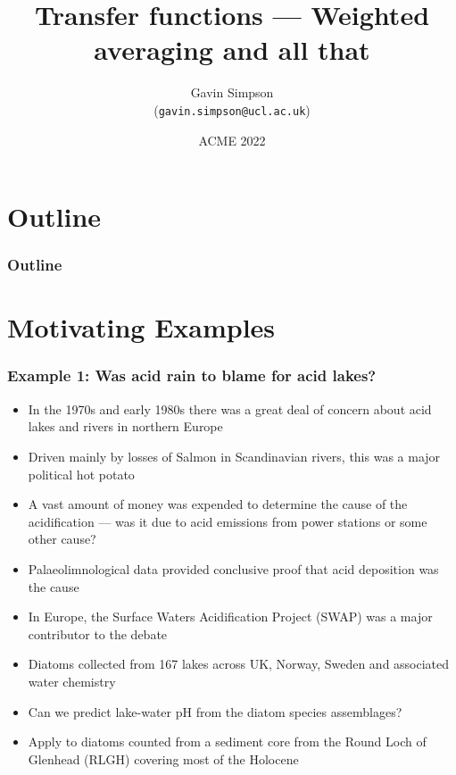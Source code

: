 \documentclass{beamer}
\title[Transfer functions]{Transfer functions --- Weighted averaging and all that}
\author[Gavin Simpson]{Gavin Simpson \\ (\texttt{gavin.simpson@ucl.ac.uk})}
\institute[Aarhus]{Aarhus University}
\date[ACME 2008]{ACME 2022}
\begin{document}
\begin{frame}
\titlepage
\end{frame}

\section*{Outline}
\begin{frame}
 \frametitle{Outline}
 \tableofcontents
\end{frame}

\section{Motivating Examples}
\begin{frame}
    \frametitle{Example 1: Was acid rain to blame for acid lakes?}
    \begin{itemize}
        \item In the 1970s and early 1980s there was a great deal of concern about acid lakes and rivers in northern Europe
        \item Driven mainly by losses of Salmon in Scandinavian rivers, this was a major political hot potato
        \item A vast amount of money was expended to determine the cause of the acidification --- was it due to acid emissions from power stations or some other cause?
        \item Palaeolimnological data provided conclusive proof that acid deposition was the cause
        \item In Europe, the Surface Waters Acidification Project (SWAP) was a major contributor to the debate
        \item Diatoms collected from 167 lakes across UK, Norway, Sweden and associated water chemistry
        \item Can we predict lake-water pH from the diatom species assemblages?
        \item Apply to diatoms counted from a sediment core from the Round Loch of Glenhead (RLGH) covering most of the Holocene
    \end{itemize}
\end{frame}
\end{document}
